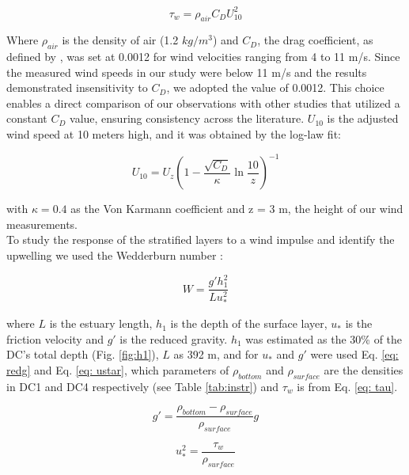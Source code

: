 \documentclass[tesis.tex]{subfiles}
\begin{document}
\begin{equation}
    \tau_w=\rho_{air} C_D U_{10}^2
    \label{eq: tau}
\end{equation}

Where $\rho_{air}$ is the density of air (1.2 $kg/m^3$) and $C_D$, the drag coefficient, as defined by \cite{large1981open}, was set at 0.0012 for wind velocities ranging from 4 to 11 m/s. Since the measured wind speeds in our study were below 11 m/s and the results demonstrated insensitivity to $C_D$, we adopted the value of 0.0012. This choice enables a direct comparison of our observations with other studies that utilized a constant $C_D$ value, ensuring consistency across the literature. $U_{10}$ is the adjusted wind speed at 10 meters high, and it was obtained by the log-law fit: 

\begin{equation}
    U_{10}=U_z(1-\frac{\sqrt{C_D}}{\kappa}\ln{\frac{10}{z}})^{-1}
    \label{eq: adjvel}
\end{equation}

with $\kappa=0.4$ as the Von Karmann coefficient and z = 3 m, the height of our wind measurements.\\

To study the response of the stratified layers to a wind impulse and identify the upwelling we used the Wedderburn number \citep{Imberger1982}:

\begin{equation}
    W=\frac{g'h_1^2}{Lu_*^2}
    \label{eq: wed}
\end{equation}

where $L$ is the estuary length, $h_1$ is the depth of the surface layer, $u_*$ is the friction velocity and $g'$ is the reduced gravity. $h_1$ was estimated as the 30\% of the DC's total depth (Fig. \ref{fig:h1}), $L$ as 392 m, and for $u_*$ and $g'$ were used Eq. \ref{eq: redg} and Eq. \ref{eq: ustar}, which parameters of $\rho_{bottom}$ and $\rho_{surface}$ are the densities in DC1 and DC4 respectively (see Table \ref{tab:instr}) and $\tau_w$ is from Eq. \ref{eq: tau}.

\begin{equation}
    g'=\frac{\rho_{bottom}-\rho_{surface}}{\rho_{surface}}g
    \label{eq: redg}
\end{equation}

\begin{equation}
    u_*^2=\frac{\tau_w}{\rho_{surface}}
    \label{eq: ustar}
\end{equation}
\end{document}
